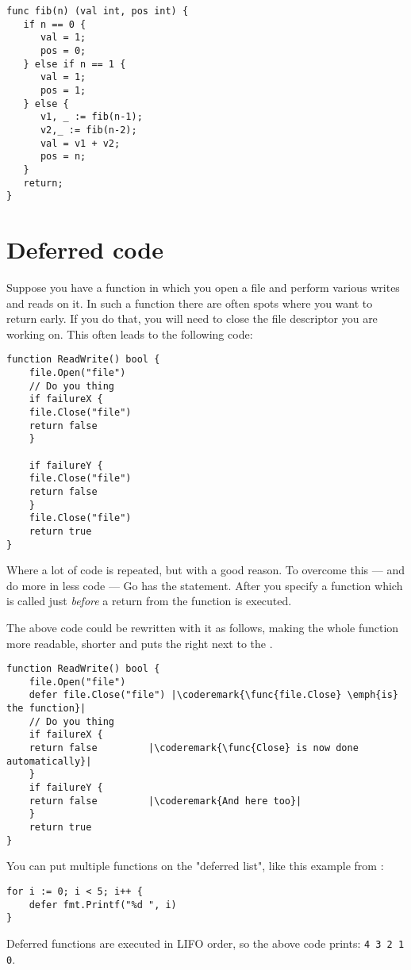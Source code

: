 \begin{lstlisting}
func fib(n) (val int, pos int) {
   if n == 0 {
      val = 1;
      pos = 0;
   } else if n == 1 {
      val = 1;
      pos = 1;
   } else {
      v1, _ := fib(n-1);
      v2,_ := fib(n-2);
      val = v1 + v2;
      pos = n;
   }
   return;
}
\end{lstlisting}

\section{Deferred code}
Suppose you have a function in which you open a file and perform various
writes and reads on it. In such a function there are often spots where
you want to return early. If you do that, you will need to close the file
descriptor you are working on. This often leads to the following code:
\begin{lstlisting}[caption=Without \func{defer}]
function ReadWrite() bool {
    file.Open("file")
    // Do you thing
    if failureX {
	file.Close("file")
	return false
    }

    if failureY {
	file.Close("file")
	return false
    }
    file.Close("file")
    return true
}
\end{lstlisting}
Where a lot of code is repeated, but with a good reason. To overcome this ---
and do more in less code --- Go has the  statement. After
 you specify a function which is called just \emph{before} a
return from the function is executed.

The above code could be rewritten with it as follows, making the whole
function more readable, shorter and puts the  right next 
to the .
\begin{lstlisting}[caption=With \func{defer}]
function ReadWrite() bool {
    file.Open("file")
    defer file.Close("file") |\coderemark{\func{file.Close} \emph{is} the function}|
    // Do you thing
    if failureX {
	return false	     |\coderemark{\func{Close} is now done automatically}|
    }
    if failureY {
	return false	     |\coderemark{And here too}|
    }
    return true
}
\end{lstlisting}
You can put multiple functions on the "deferred list", like this
example from \cite{effective_go}:
\begin{lstlisting}
for i := 0; i < 5; i++ { 
    defer fmt.Printf("%d ", i) 
} 
\end{lstlisting}
Deferred functions are executed in LIFO order, so the above code
prints: \lstinline{4 3 2 1 0}. 

